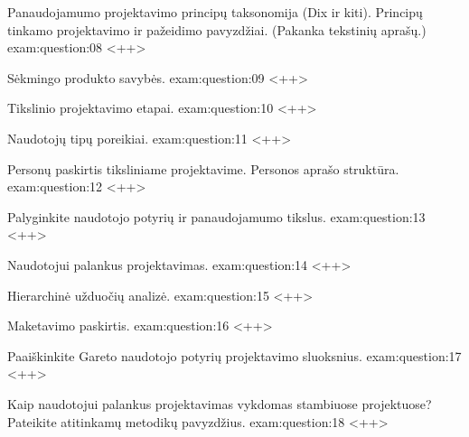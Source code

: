 \begin{question}{%
  Panaudojamumo projektavimo principų taksonomija (Dix ir kiti).
  Principų tinkamo projektavimo ir pažeidimo pavyzdžiai. (Pakanka
  tekstinių aprašų.)
  }{exam:question:08}
  <++>
\end{question}

\begin{question}{%
  Sėkmingo produkto savybės.
  }{exam:question:09}
  <++>
\end{question}

\begin{question}{%
  Tikslinio projektavimo etapai.
  }{exam:question:10}
  <++>
\end{question}

\begin{question}{%
  Naudotojų tipų poreikiai.
  }{exam:question:11}
  <++>
\end{question}

\begin{question}{%
  Personų paskirtis tiksliniame projektavime. Personos aprašo struktūra.
  }{exam:question:12}
  <++>
\end{question}

\begin{question}{%
  Palyginkite naudotojo potyrių ir panaudojamumo tikslus.
  }{exam:question:13}
  <++>
\end{question}

\begin{question}{%
  Naudotojui palankus projektavimas.
  }{exam:question:14}
  <++>
\end{question}

\begin{question}{%
  Hierarchinė užduočių analizė.
  }{exam:question:15}
  <++>
\end{question}

\begin{question}{%
  Maketavimo paskirtis.
  }{exam:question:16}
  <++>
\end{question}

\begin{question}{%
  Paaiškinkite Gareto naudotojo potyrių projektavimo sluoksnius.
  }{exam:question:17}
  <++>
\end{question}

\begin{question}{%
  Kaip naudotojui palankus projektavimas vykdomas stambiuose projektuose?
  Pateikite atitinkamų metodikų pavyzdžius.
  }{exam:question:18}
  <++>
\end{question}

